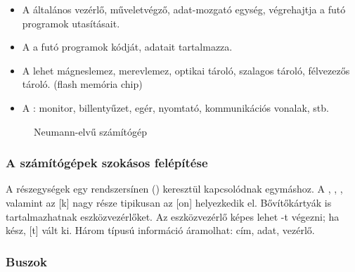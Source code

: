 \documentclass[../main.tex]{subfiles}
\begin{document}
\begin{itemize}
	\item A 
	      általános vezérlő, műveletvégző, adat-mozgató egység,
	      végrehajtja a futó programok utasításait.

	\item A 
	      a futó programok kódját, adatait tartalmazza.

	\item A 
	      lehet mágneslemez, merevlemez, optikai tároló,
	      szalagos tároló, félvezezős tároló.
	      (flash memória chip)

	\item A :
	      monitor, billentyűzet, egér,
	      nyomtató, kommunikációs vonalak, stb.
\end{itemize}
\begin{figure}[H]
	\centering
	\caption{Neumann-elvű számítógép}
	\label{fig:neumann}
\end{figure}

\subsubsection{A számítógépek szokásos felépítése}

A részegységek egy rendszersínen () keresztül kapcsolódnak
egymáshoz. A , , , valamint
az [k] nagy része tipikusan az [on] helyezkedik el.
Bővítőkártyák is tartalmazhatnak eszközvezérlőket.
Az eszközvezérlő képes lehet -t végezni; ha kész, [t]
vált ki. Három típusú információ áramolhat: cím, adat, vezérlő.

\subsubsection*{Buszok}
\end{document}
